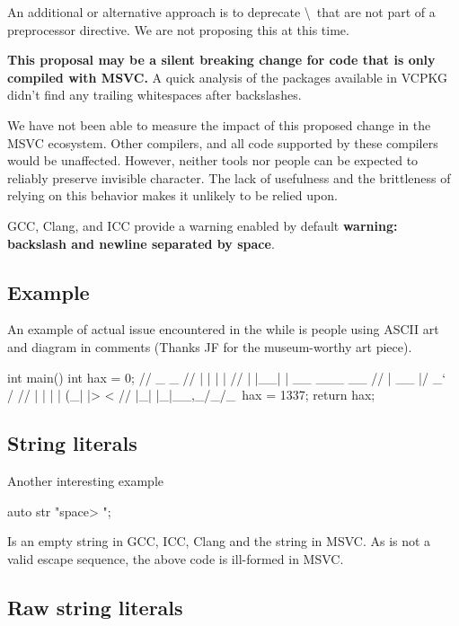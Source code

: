 \documentclass{wg21}
\begin{document}
An additional or alternative approach is to deprecate \textbackslash \ that are not part of a preprocessor directive.
We are not proposing this at this time.

\textbf{This proposal may be a silent breaking change for code that is only compiled with MSVC.}
A quick analysis of the packages available in VCPKG didn't find any trailing whitespaces after backslashes.

We have not been able to measure the impact of this proposed change in the MSVC ecosystem. Other compilers, 
and all code supported by these compilers would be unaffected.
However, neither tools nor people can be expected to reliably preserve invisible character.
The lack of usefulness and the brittleness of relying on this behavior makes it unlikely to be relied upon.

GCC, Clang, and ICC provide a warning enabled by default \textbf{warning: backslash and newline separated by space}.

\subsection{Example}

An example of actual issue encountered in the while is people using ASCII art and diagram in comments (Thanks JF for the museum-worthy art piece).

\begin{colorblock}
int main() {
    int hax = 0;
    //  _    _            
    // | |  | |          
    // | |__| | __ ___  __
    // |  __  |/ _` \ \/ /
    // | |  | | (_| |>  <  
    // |_|  |_|\__,_/_/\_\
    hax = 1337;
    return hax;
}
\end{colorblock}


\subsection{String literals}

Another interesting example

\begin{colorblock}
auto str  "\<space>
";
\end{colorblock}

Is an empty string in GCC, ICC, Clang and the string  in MSVC.
As \tcode{'\textbackslash \ '} is not a valid escape sequence, the above code is ill-formed in MSVC.

\subsection{Raw string literals}
\end{document}
